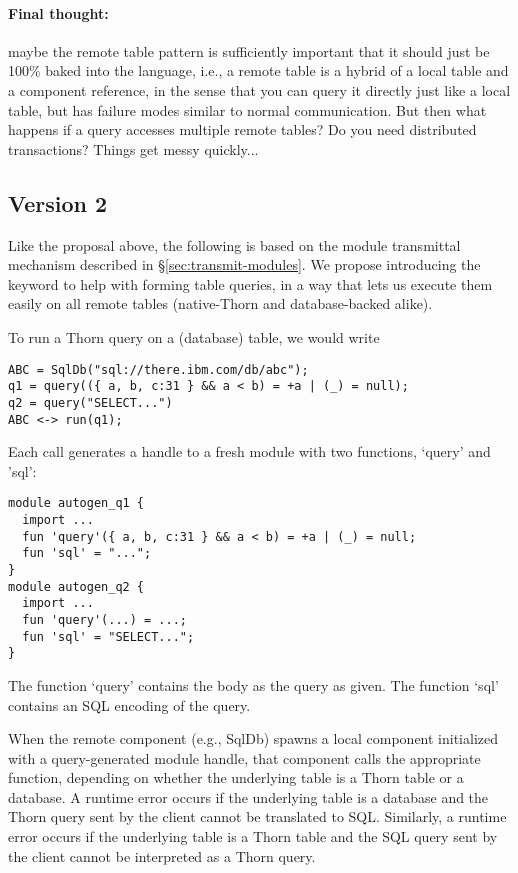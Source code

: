 \paragraph{Final thought:} maybe the remote table pattern is sufficiently important that it should just be 100\% baked into the language, i.e., a remote table is a hybrid of a local table and a component reference, in the sense that you can query it directly just like a local table, but has failure modes similar to normal communication.  But then what happens if a query accesses multiple remote tables?  Do you need distributed transactions?  Things get messy quickly...

\subsection{Version 2}

Like the proposal above, the following is based on the module transmittal mechanism described in \S\ref{sec:transmit-modules}.  We propose introducing the  keyword to help with forming table queries, in a way that lets us execute them easily on all remote tables (native-Thorn and database-backed alike).

To run a Thorn query on a (database) table, we would write
\begin{lstlisting}
ABC = SqlDb("sql://there.ibm.com/db/abc");
q1 = query(({ a, b, c:31 } && a < b) = +a | (_) = null);
q2 = query("SELECT...")
ABC <-> run(q1);
\end{lstlisting}

Each  call generates a handle to a fresh module with two functions, `query' and 'sql':
\begin{lstlisting}
module autogen_q1 {
  import ...
  fun 'query'({ a, b, c:31 } && a < b) = +a | (_) = null;
  fun 'sql' = "...";
}
module autogen_q2 {
  import ...
  fun 'query'(...) = ...;
  fun 'sql' = "SELECT...";
}
\end{lstlisting}

The function `query' contains the body as the query as given.  The function `sql' contains an SQL encoding of the query.  

When the remote component (e.g., SqlDb) spawns a local component initialized with a query-generated module handle, that component calls the appropriate function, depending on whether the underlying table is a Thorn table or a database.  A runtime error occurs if the underlying table is a database and the Thorn query sent by the client cannot be translated to SQL.  Similarly, a runtime error occurs if the underlying table is a Thorn table and the SQL query sent by the client cannot be interpreted as a Thorn query.

